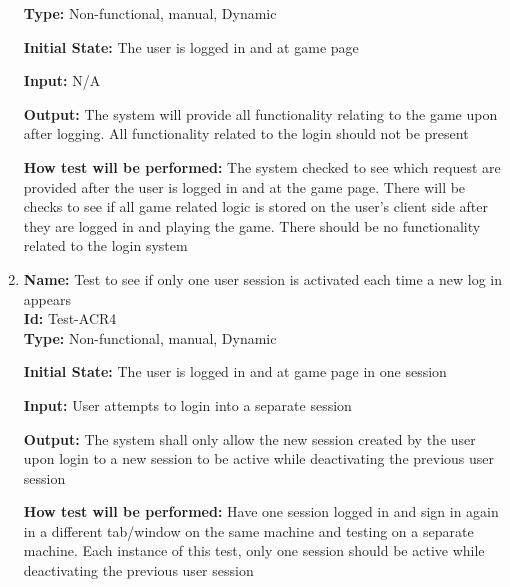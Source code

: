\documentclass[12pt, titlepage]{article}
\begin{document}
\begin{enumerate}
    \textbf{Type:} Non-functional, manual, Dynamic
    					
    \textbf{Initial State:} The user is logged in and at game page
    					
    \textbf{Input:} N/A
    					
    \textbf{Output:} The system will provide all functionality relating to the game upon after logging. All functionality related to the login should not be present 
    					
    \textbf{How test will be performed:} The system checked to see which request are provided after the user is logged in and at the game page. There will be checks to see if all game related logic is stored on the user's client side after they are logged in and playing the game. There should be no functionality related to the login system 
    
    \item{\textbf{Name:} Test to see if only one user session is activated each time a new log in appears\\} \label{Test-ACR4}
    \textbf{Id: }Test-ACR4\\
    
    \textbf{Type:} Non-functional, manual, Dynamic
    					
    \textbf{Initial State:} The user is logged in and at game page in one session
    					
    \textbf{Input:} User attempts to login into a separate session
    					
    \textbf{Output:} The system shall only allow the new session created by the user upon login to a new session to be active while deactivating the previous user session
    					
    \textbf{How test will be performed:} Have one session logged in and sign in again in a different tab/window on the same machine and testing on a separate machine. Each instance of this test, only one session should be active while deactivating the previous user session 
    
\end{enumerate}
\end{document}
